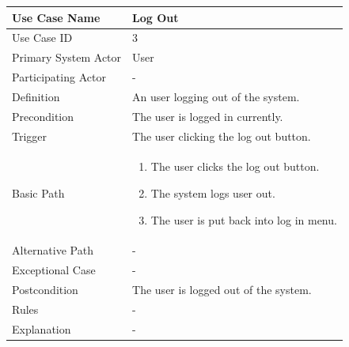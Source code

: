 \documentclass[a4paper,12pt]{report}
\begin{document}
		\begin{tabular}{|m{4cm}|m{11.5cm}|}
			\hline
				Use Case Name & Log Out\\
			\hline
				Use Case ID & 3\\
			\hline
				Primary System Actor & User\\
			\hline
				Participating Actor & -\\
			\hline
				Definition & An user logging out of the system.\\
			\hline
				Precondition & The user is logged in currently.\\
			\hline
				Trigger & The user clicking the log out button.\\
			\hline
				Basic Path & \begin{enumerate}
					\item The user clicks the log out button.
					\item The system logs user out.
					\item The user is put back into log in menu.
				\end{enumerate}		
				\\
			\hline
				Alternative Path & -\\
			\hline
				Exceptional Case & -\\
			\hline
				Postcondition & The user is logged out of the system.\\
			\hline
				Rules & -\\
			\hline
				Explanation & -\\
			\hline
		\end{tabular}
\end{document}
